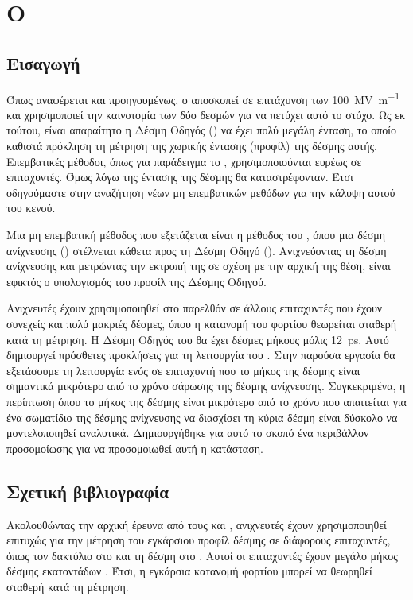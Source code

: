 \section{Ο }

\subsection{Εισαγωγή}

Όπως αναφέρεται και προηγουμένως, ο  αποσκοπεί σε επιτάχυνση των \SI[per-mode = symbol]{100}{\mega \volt \per \metre} και χρησιμοποιεί την καινοτομία των δύο δεσμών για να πετύχει αυτό το στόχο. 
Ως εκ τούτου, είναι απαραίτητο η Δέσμη Οδηγός () να έχει πολύ μεγάλη ένταση, το οποίο καθιστά πρόκληση τη μέτρηση της χωρικής έντασης (προφίλ) της δέσμης αυτής. 
Επεμβατικές μέθοδοι, όπως για παράδειγμα το , χρησιμοποιούνται ευρέως σε επιταχυντές. Όμως λόγω της έντασης της δέσμης θα καταστρέφονταν. 
Έτσι οδηγούμαστε στην αναζήτηση νέων μη επεμβατικών μεθόδων για την κάλυψη αυτού του κενού.

Μια μη επεμβατική μέθοδος που εξετάζεται είναι η μέθοδος του , όπου μια δέσμη ανίχνευσης () στέλνεται κάθετα προς τη Δέσμη Οδηγό (). 
Ανιχνεύοντας τη δέσμη ανίχνευσης και μετρώντας την εκτροπή της σε σχέση με την αρχική της θέση, είναι εφικτός ο υπολογισμός του προφίλ της Δέσμης Οδηγού.

Ανιχνευτές  έχουν χρησιμοποιηθεί στο παρελθόν σε άλλους επιταχυντές που έχουν συνεχείς και πολύ μακριές δέσμες, όπου η κατανομή του φορτίου θεωρείται σταθερή κατά τη μέτρηση.
Η Δέσμη Οδηγός του  θα έχει δέσμες μήκους μόλις \SI{12}{\pico\second}. 
Αυτό δημιουργεί πρόσθετες προκλήσεις για τη λειτουργία του .
Στην παρούσα εργασία θα εξετάσουμε τη λειτουργία ενός  σε επιταχυντή που το μήκος της δέσμης είναι σημαντικά μικρότερο από το χρόνο σάρωσης της δέσμης ανίχνευσης. 
Συγκεκριμένα, η περίπτωση όπου το μήκος της δέσμης είναι μικρότερο από το χρόνο που απαιτείται για ένα σωματίδιο της δέσμης ανίχνευσης να διασχίσει τη κύρια δέσμη είναι δύσκολο να μοντελοποιηθεί αναλυτικά. 
Δημιουργήθηκε για αυτό το σκοπό ένα περιβάλλον προσομοίωσης για να προσομοιωθεί αυτή η κατάσταση.

\subsection{Σχετική βιβλιογραφία}
Ακολουθώντας την αρχική έρευνα από τους  και  \cite{Pasour1992}, ανιχνευτές  έχουν χρησιμοποιηθεί επιτυχώς για την μέτρηση του εγκάρσιου προφίλ δέσμης σε διάφορους επιταχυντές, όπως τον δακτύλιο  στο  \cite{Aleksandrov2005} \cite{Blokland2009} και τη δέσμη  στο  \cite{Roy2005}. 
Αυτοί οι επιταχυντές έχουν μεγάλο μήκος δέσμης εκατοντάδων . 
Έτσι, η εγκάρσια κατανομή φορτίου μπορεί να θεωρηθεί σταθερή κατά τη μέτρηση.

